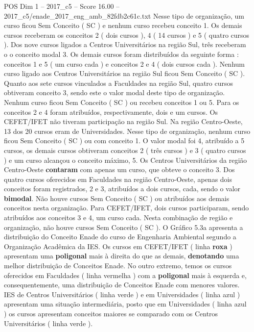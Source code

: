 \begin{textsample}{POS Dim 1 – 2017\_c5 – Score 16.00 – 2017\_c5/enade\_2017\_eng\_amb\_82fdb2c61c.txt}
Nesse tipo de organização, um curso ficou Sem Conceito ( SC ) e nenhum curso recebeu conceito 1.
Os demais cursos receberam os conceitos 2 ( dois cursos ), 4 ( 14 cursos ) e 5 ( quatro cursos ).
Dos nove cursos ligados a Centros Universitários na região Sul, três receberam o o conceito modal 3.
Os demais cursos foram distribuídos da seguinte forma : conceitos 1 e 5 ( um curso cada ) e conceitos 2 e 4 ( dois cursos cada ).
Nenhum curso ligado aos Centros Universitários na região Sul ficou Sem Conceito ( SC ).
Quanto aos sete cursos vinculados a Faculdades na região Sul, quatro cursos obtiveram conceito 3, sendo este o valor modal deste tipo de organização.
Nenhum curso ficou Sem Conceito ( SC ) ou recebeu conceitos 1 ou 5.
Para os conceitos 2 e 4 foram atribuídos, respectivamente, dois e um cursos.
Os CEFET/IFET não tiveram participação na região Sul.
Na região Centro-Oeste, 13 dos 20 cursos eram de Universidades.
Nesse tipo de organização, nenhum curso ficou Sem Conceito ( SC ) ou com conceito 1.
O valor modal foi 4, atribuído a 5 cursos, os demais cursos obtiveram conceitos 2 ( três cursos ) e 3 ( quatro cursos ) e um curso alcançou o conceito máximo, 5.
Os Centros Universitários da região Centro-Oeste \textbf{contaram} com apenas um curso, que obteve o conceito 3.
Dos quatro cursos oferecidos em Faculdades na região Centro-Oeste, apenas dois conceitos foram registrados, 2 e 3, atribuídos a dois cursos, cada, sendo o valor \textbf{bimodal}.
Não houve cursos Sem Conceito ( SC ) ou atribuídos aos demais conceitos nesta organização.
Para CEFET/IFET, dois cursos participaram, sendo atribuídos aos conceitos 3 e 4, um curso cada.
Nesta combinação de região e organização, não houve cursos Sem Conceito ( SC ).
O Gráfico 5.3a apresenta a distribuição do Conceito Enade do curso de Engenharia Ambiental segundo a Organização Acadêmica da IES.
Os cursos em CEFET/IFET ( linha \textbf{roxa} ) apresentam uma \textbf{poligonal} mais à direita do que as demais, \textbf{denotando} uma melhor distribuição de Conceitos Enade.
No outro extremo, temos os cursos oferecidos em Faculdades ( linha vermelha ) com a \textbf{poligonal} mais à esquerda e, consequentemente, uma distribuição de Conceitos Enade com menores valores.
IES de Centros Universitários ( linha verde ) e em Universidades ( linha azul ) apresentam uma situação intermediária, posto que em Universidades ( linha azul ) os cursos apresentam conceitos maiores se comparado com os Centros Universitários ( linha verde ).

\end{textsample}
